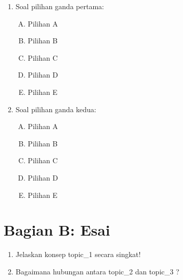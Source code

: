 \documentclass[a4paper]{article}
\begin{document}
\begin{enumerate}
    \item Soal pilihan ganda pertama:
        \begin{enumerate}[A.]
            \item Pilihan A
            \item Pilihan B
            \item Pilihan C
            \item Pilihan D
            \item Pilihan E
        \end{enumerate}
    \item Soal pilihan ganda kedua:
        \begin{enumerate}[A.]
            \item Pilihan A
            \item Pilihan B
            \item Pilihan C
            \item Pilihan D
            \item Pilihan E
        \end{enumerate}
\end{enumerate}

\section*{Bagian B: Esai}

\begin{enumerate}
    \item Jelaskan konsep {{ topic_1 }} secara singkat!
    \item Bagaimana hubungan antara {{ topic_2 }} dan {{ topic_3 }}?
\end{enumerate}
\end{document}
